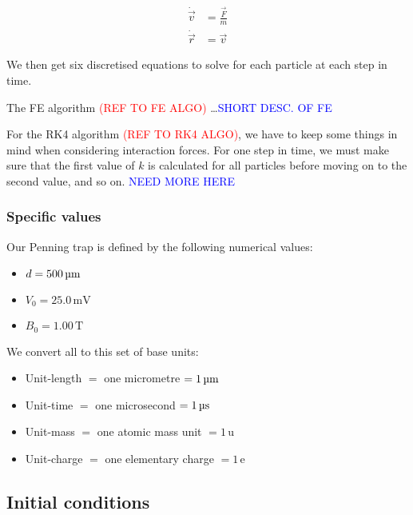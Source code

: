 \begin{equation}\label{eq:split_ODEs}
    \begin{split}
        \dot{\vec{v}} &= \frac{\vec{F}}{m} \\
        \dot{\vec{r}} &= \vec{v}
    \end{split}
\end{equation}

We then get six discretised equations to solve for each particle at each step in time.

The FE algorithm \textcolor{red}{(REF TO FE ALGO)} 
\dots \textcolor{blue}{SHORT DESC. OF FE}

For the RK4 algorithm \textcolor{red}{(REF TO RK4 ALGO)}, we have to keep some things in mind when considering interaction forces. For one step in time, we must make sure that the first value of $k$ is calculated for all particles before moving on to the second value, and so on. 
\textcolor{blue}{NEED MORE HERE}


\subsubsection*{Specific values}  %

Our Penning trap is defined by the following numerical values:

\begin{itemize}
    \item[] $d=500 \,\mathrm{\text{\textmu} m}$
    \item[] $V_0=25.0 \,\mathrm{mV}$
    \item[] $B_0=1.00 \,\mathrm{T}$
\end{itemize}

We convert all to this set of base units:

\begin{itemize}
    \item[] Unit-length $=$ one micrometre $= 1\, \mathrm{\text{\textmu}m} $ 
    \item[] Unit-time $=$ one microsecond $= 1\, \mathrm{\text{\textmu}s} $
    \item[] Unit-mass $=$ one atomic mass unit $= 1\, \mathrm{u} $
    \item[] Unit-charge $=$ one elementary charge $= 1\, \mathrm{e} $
\end{itemize}


\subsection{Initial conditions}\label{sec:initial_conditions}

